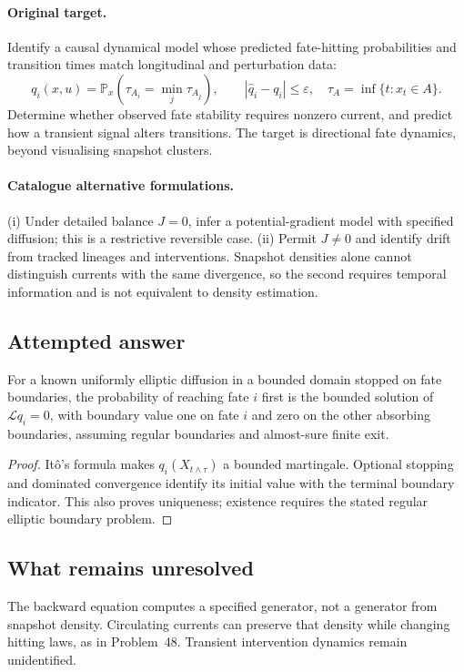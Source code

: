 \documentclass[11pt]{article}
\begin{document}
\paragraph{Original target.}
Identify a causal dynamical model whose predicted fate-hitting probabilities and transition times match longitudinal and perturbation data:
\[
q_i(x,u)=\mathbb{P}_x(\tau_{A_i}=\min_j\tau_{A_j}),
\qquad
|\widehat q_i-q_i|\leq\varepsilon,
\quad\tau_A=\inf\{t:x_t\in A\}.
\]
Determine whether observed fate stability requires nonzero current, and predict how a transient signal alters transitions. The target is directional fate dynamics, beyond visualising snapshot clusters.
\paragraph{Catalogue alternative formulations.}
(i) Under detailed balance $J=0$, infer a potential-gradient model with specified diffusion; this is a restrictive reversible case. (ii) Permit $J\neq0$ and identify drift from tracked lineages and interventions. Snapshot densities alone cannot distinguish currents with the same divergence, so the second requires temporal information and is not equivalent to density estimation.
\subsection{Attempted answer}
\begin{proposition}
For a known uniformly elliptic diffusion in a bounded domain stopped on fate boundaries, the probability of reaching fate $i$ first is the bounded solution of $\mathcal Lq_i=0$, with boundary value one on fate $i$ and zero on the other absorbing boundaries, assuming regular boundaries and almost-sure finite exit.
\end{proposition}
\begin{proof}
It\^o's formula makes $q_i(X_{t\wedge\tau})$ a bounded martingale. Optional stopping and dominated convergence identify its initial value with the terminal boundary indicator. This also proves uniqueness; existence requires the stated regular elliptic boundary problem.
\end{proof}
\subsection{What remains unresolved}
The backward equation computes a specified generator, not a generator from snapshot density. Circulating currents can preserve that density while changing hitting laws, as in Problem~48. Transient intervention dynamics remain unidentified.
\end{document}
